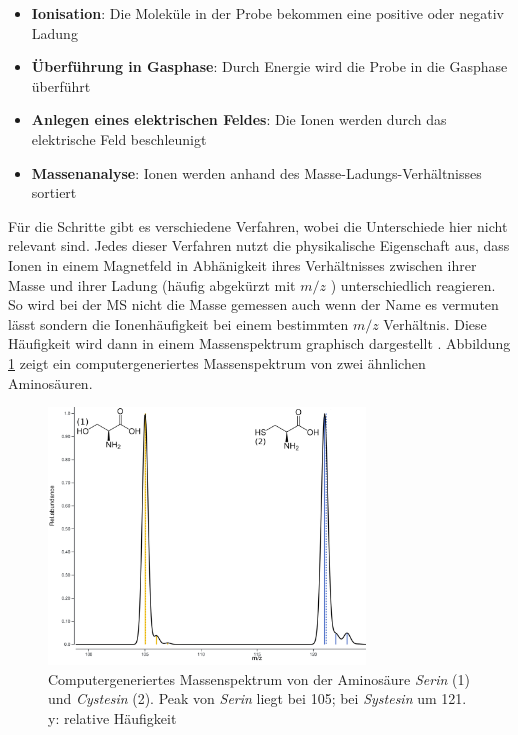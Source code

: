 \documentclass[a4paper, 12pt]{article}
\newcommand{\gerquot}[1]{\glqq#1\grqq}
\newcommand{\dashAndSpace}{\textendash \space}
\newcommand{\dashAndSpaceSeq}[1]{\dashAndSpace#1 \dashAndSpace}
\newcommand{\massCharge}{$ m/z $ }
\begin{document}
\begin{itemize}
   \item \textbf{Ionisation}: Die Moleküle in der Probe bekommen eine positive oder negativ Ladung
   \item \textbf{Überführung in Gasphase}: Durch Energie wird die Probe in die Gasphase überführt
   \item \textbf{Anlegen eines elektrischen Feldes}: Die Ionen werden durch das elektrische Feld beschleunigt
   \item \textbf{Massenanalyse}: Ionen werden anhand des Masse-Ladungs-Verhältnisses \gerquot{sortiert}
\end{itemize}

Für die Schritte gibt es verschiedene Verfahren, wobei die Unterschiede hier nicht relevant sind. Jedes dieser Verfahren nutzt die physikalische Eigenschaft aus, dass Ionen in einem Magnetfeld in Abhänigkeit ihres Verhältnisses zwischen ihrer Masse und ihrer Ladung (häufig abgekürzt mit \massCharge) unterschiedlich reagieren. So wird bei der MS nicht die Masse gemessen \dashAndSpaceSeq{auch wenn der Name es vermuten lässt} sondern die Ionenhäufigkeit bei einem bestimmten \massCharge Verhältnis. Diese Häufigkeit wird dann in einem Massenspektrum graphisch dargestellt \cite{Glish2003}. Abbildung \ref{fig:Sim_Mass_Spec} zeigt ein computergeneriertes Massenspektrum von zwei ähnlichen Aminosäuren.

\begin{figure}[H]
   \label{fig:Sim_Mass_Spec}
   \includegraphics[width=0.75\textwidth]{./Resources/Simulated_Mass_Spectrum.png}
   \centering
   \caption{Computergeneriertes Massenspektrum von der Aminosäure \emph{Serin} (1) und \emph{Cystesin} (2). Peak von \emph{Serin} liegt bei 105; bei \emph{Systesin} um 121. y: relative Häufigkeit}
\end{figure}
\end{document}
